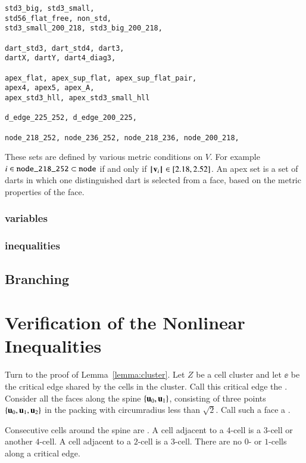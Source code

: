 \begin{verbatim}
std3_big, std3_small, 
std56_flat_free, non_std, 
std3_small_200_218, std3_big_200_218,

dart_std3, dart_std4, dart3,
dartX, dartY, dart4_diag3,

apex_flat, apex_sup_flat, apex_sup_flat_pair,
apex4, apex5, apex_A, 
apex_std3_hll, apex_std3_small_hll

d_edge_225_252, d_edge_200_225,

node_218_252, node_236_252, node_218_236, node_200_218, 
\end{verbatim}

These sets are defined by various metric conditions on $V$.  For example
$i\in \text{\tt node\_218\_252}\subset \text{\tt node}$ 
if and only if ${{\hskip0.1em|\hskip-0.15em|\hskip0.1em}{\mathbf v}_i{\hskip0.1em|\hskip-0.15em|\hskip0.1em}}\in[ 2.18,2.52
]$.  An apex set is a set of darts in which one distinguished dart
is selected from a face, based on the metric properties of the face.


\subsection{variables}

\subsection{inequalities}

\section{Branching}


\chapter{Verification of the Nonlinear  Inequalities}

Turn to the proof of Lemma~\ref{lemma:cluster}.  Let $Z$ be a cell
cluster and let $\ee$ be the critical edge shared by the cells in the
cluster.  Call this critical edge the .  Consider all
the faces along the spine $\{ {\mathbf u}_0, {\mathbf u}_1\}$, consisting of three
points $\{ {\mathbf u}_0, {\mathbf u}_1, {\mathbf u}_2\}$ in the packing with circumradius less
than $\sqrt2$.  Call such a face a . 

Consecutive cells around the spine are .  A cell
adjacent to a $4$-cell is a $3$-cell or another $4$-cell.  A cell
adjacent to a $2$-cell is a $3$-cell.  There are no $0$- or $1$-cells
along a critical edge.   %

